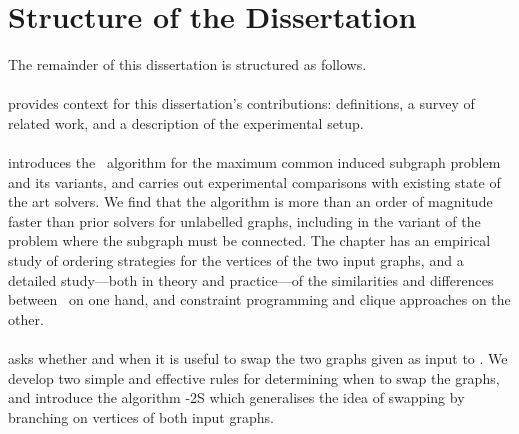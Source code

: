 \section{Structure of the Dissertation}

The remainder of this dissertation is structured as follows.

\paragraph*{} \hspace{-.8em} provides context for this dissertation's
contributions: definitions, a survey of related work, and a description of the
experimental setup.

\paragraph*{} \hspace{-.8em} introduces the \McSplit\
algorithm for the maximum common induced subgraph problem and its variants, and
carries out experimental comparisons with existing state of the art solvers.
We find that the algorithm is more than an order of magnitude faster than prior
solvers for unlabelled graphs, including in the variant of the problem
where the subgraph must be connected.
The chapter has an empirical study of ordering strategies for the vertices
of the two input graphs, and a detailed study---both in theory and practice---of
the similarities and differences
between \McSplit\ on one hand, and constraint programming and clique approaches
on the other.


\paragraph*{} \hspace{-.8em} asks whether and when it is
useful to swap the two graphs given as input to \McSplit.  We develop two
simple and effective rules for determining when to swap the graphs, and
introduce the algorithm \McSplit-2S which generalises the idea of swapping by branching on vertices of
both input graphs.

